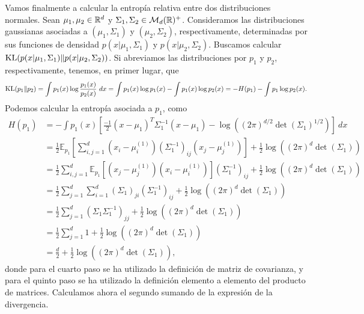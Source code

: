 Vamos finalmente a calcular la entropía relativa entre dos distribuciones normales. Sean $\mu_1,\mu_2 \in \mathbb{R}^d$ y $\Sigma_1,\Sigma_2 \in \mathcal{M}_d(\mathbb{R})^+$. Consideramos las distribuciones gaussianas asociadas a $(\mu_1,\Sigma_1)$ y $(\mu_2,\Sigma_2)$, respectivamente, determinadas por sus funciones de densidad $p(x|\mu_1,\Sigma_1)$ y $p(x|\mu_2,\Sigma_2)$. Buscamos calcular $\operatorname{KL}(p(x|\mu_1,\Sigma_1)\|p(x|\mu_2,\Sigma_2))$. Si abreviamos las distribuciones por $p_1$ y $p_2$, respectivamente, tenemos, en primer lugar, que
\[ \operatorname{KL}(p_1\|p_2) = \int p_1(x)\log\frac{p_1(x)}{p_2(x)}\ dx = \int p_1(x) \log p_1(x) - \int p_1(x) \log p_2(x) = -H(p_1) - \int p_1 \log p_2(x). \]
Podemos calcular la entropía asociada a $p_1$, como
\begin{equation} \label{eq:kl_gaussian:sum_1}
\begin{split}
 H(p_1) &= - \int p_1(x) \left[ \frac{-1}{2}(x-\mu_1)^T\Sigma_1^{-1}(x-\mu_1) - \log((2\pi)^{d/2}\det(\Sigma_1)^{1/2}) \right] \ dx \\
        &= \frac{1}{2} \mathbb{E}_{p_1}\left[ \sum_{i,j=1}^d (x_i - \mu_i^{(1)}) (\Sigma_1^{-1})_{ij}(x_j - \mu_j^{(1)})\right] + \frac{1}{2}\log((2\pi)^d\det(\Sigma_1)) \\
        &= \frac{1}{2} \sum_{i,j=1}^d\mathbb{E}_{p_1}[(x_j - \mu_j^{(1)})(x_i - \mu_i^{(1)})](\Sigma_1^{-1})_{ij} + \frac{1}{2}\log((2\pi)^d\det(\Sigma_1)) \\
        &= \frac{1}{2} \sum_{j=1}^d\sum_{i=1}^d (\Sigma_1)_{ji}(\Sigma_1^{-1})_{ij} + \frac{1}{2}\log((2\pi)^d\det(\Sigma_1)) \\
        &= \frac{1}{2} \sum_{j=1}^d (\Sigma_1\Sigma_1^{-1})_{jj} + \frac{1}{2}\log((2\pi)^d\det(\Sigma_1)) \\
        &= \frac{1}{2} \sum_{j=1}^d 1 + \frac{1}{2}\log((2\pi)^d\det(\Sigma_1)) \\
        &= \frac{d}{2} + \frac{1}{2}\log((2\pi)^d\det(\Sigma_1)),
\end{split}
\end{equation}
donde para el cuarto paso se ha utilizado la definición de matriz de covarianza, y para el quinto paso se ha utilizado la definición elemento a elemento del producto de matrices. Calculamos ahora el segundo sumando de la expresión de la divergencia.
